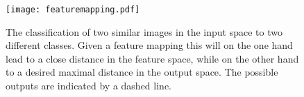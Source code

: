 \begin{figure}[H]
\centering
\texttt{[image: featuremapping.pdf]}
\caption{The classification of two similar images in the input space to two different classes. Given a feature mapping this will on the one hand lead to a close distance in the feature space, while on the other hand to a desired maximal distance in the output space. The possible outputs are indicated by a dashed line.}
\label{fig:featuremapping}
\end{figure}
%
%
